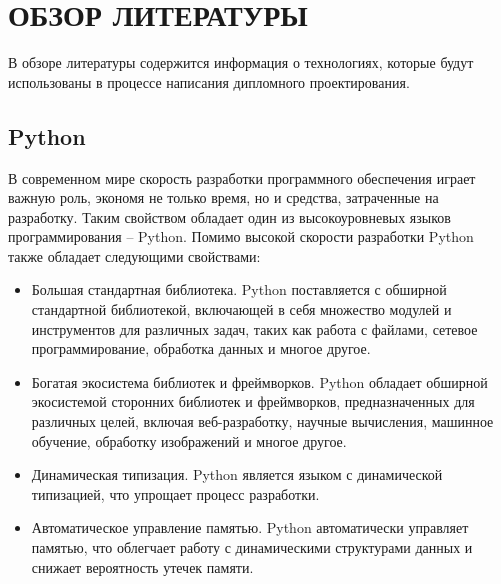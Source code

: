 \section{ОБЗОР ЛИТЕРАТУРЫ}
\label{sec:domain}

В обзоре литературы содержится информация о технологиях, которые будут использованы в процессе написания дипломного проектирования.


\subsection{Python}\label{subsec:domain:python}
В современном мире скорость разработки программного обеспечения играет важную роль, экономя не только время, но и средства, затраченные на разработку.
Таким свойством обладает один из высокоуровневых языков программирования -- Python.
Помимо высокой скорости разработки Python также обладает следующими свойствами:
\begin{itemize}
    \item Большая стандартная библиотека.
    Python поставляется с обширной стандартной библиотекой, включающей в себя множество модулей и инструментов для различных задач, таких как работа с файлами, сетевое программирование, обработка данных и многое другое.
    \item Богатая экосистема библиотек и фреймворков.
    Python обладает обширной экосистемой сторонних библиотек и фреймворков, предназначенных для различных целей, включая веб-разработку, научные вычисления, машинное обучение, обработку изображений и многое другое.
    \item Динамическая типизация.
    Python является языком с динамической типизацией, что упрощает процесс разработки.
    \item Автоматическое управление памятью.
    Python автоматически управляет памятью, что облегчает работу с динамическими структурами данных и снижает вероятность утечек памяти.
\end{itemize}

